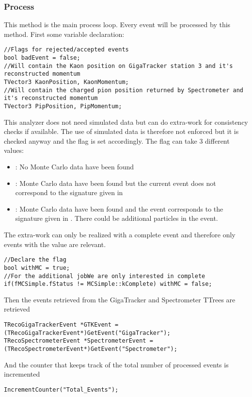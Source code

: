 \subsubsection{Process}
This method is the main process loop. Every event will be processed by this method. First some
variable declaration:
\begin{lstlisting}
//Flags for rejected/accepted events
bool badEvent = false;
//Will contain the Kaon position on GigaTracker station 3 and it's reconstructed momentum
TVector3 KaonPosition, KaonMomentum;
//Will contain the charged pion position returned by Spectrometer and it's reconstructed momentum 
TVector3 PipPosition, PipMomentum;
\end{lstlisting}

This analyzer does not need simulated data but can do extra-work for consistency checks if
available. The use of simulated data is therefore not enforced but it is checked anyway and the
 flag is set accordingly. The  flag can take 3 different values:
\begin{itemize}
  \item {}: No Monte Carlo data have been found
  \item {}: Monte Carlo data have been found but the current event does not correspond
  to the signature given in  
  \item {}: Monte Carlo data have been found and the event corresponds to the signature
  given in . There could be additional particles in the event.
\end{itemize}
The extra-work can only be realized with a complete event and therefore only events with the value
 are relevant.

\begin{lstlisting}
//Declare the flag
bool withMC = true;
//For the additional jobWe are only interested in complete 
if(fMCSimple.fStatus != MCSimple::kComplete) withMC = false;
\end{lstlisting}

Then the events retrieved from the GigaTracker and Spectrometer TTrees are retrieved
\begin{lstlisting}
TRecoGigaTrackerEvent *GTKEvent = (TRecoGigaTrackerEvent*)GetEvent("GigaTracker");
TRecoSpectrometerEvent *SpectrometerEvent = (TRecoSpectrometerEvent*)GetEvent("Spectrometer");
\end{lstlisting}

And the counter that keeps track of the total number of processed events is incremented
\begin{lstlisting}
IncrementCounter("Total_Events");
\end{lstlisting}

